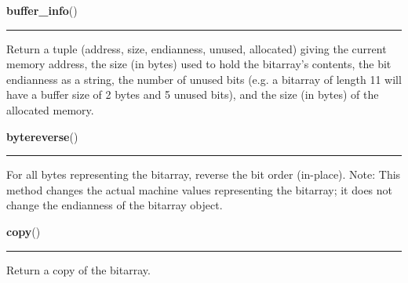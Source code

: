     \label{bitarray:_bitarray:buffer_info}

    \vspace{0.5ex}

    \begin{boxedminipage}{\textwidth}

    \raggedright \textbf{buffer\_info}()

    \vspace{-1.5ex}

    \rule{\textwidth}{0.5\fboxrule}

Return a tuple (address, size, endianness, unused, allocated) giving the
current memory address, the size (in bytes) used to hold the bitarray's
contents, the bit endianness as a string, the number of unused bits
(e.g. a bitarray of length 11 will have a buffer size of 2 bytes and
5 unused bits), and the size (in bytes) of the allocated memory.
    \vspace{1ex}

    \end{boxedminipage}

    \label{bitarray:_bitarray:bytereverse}

    \vspace{0.5ex}

    \begin{boxedminipage}{\textwidth}

    \raggedright \textbf{bytereverse}()

    \vspace{-1.5ex}

    \rule{\textwidth}{0.5\fboxrule}

For all bytes representing the bitarray, reverse the bit order (in-place).
Note: This method changes the actual machine values representing the
bitarray; it does not change the endianness of the bitarray object.
    \vspace{1ex}

    \end{boxedminipage}

    \label{bitarray:_bitarray:copy}

    \vspace{0.5ex}

    \begin{boxedminipage}{\textwidth}

    \raggedright \textbf{copy}()

    \vspace{-1.5ex}

    \rule{\textwidth}{0.5\fboxrule}

Return a copy of the bitarray.
    \vspace{1ex}

    \end{boxedminipage}

